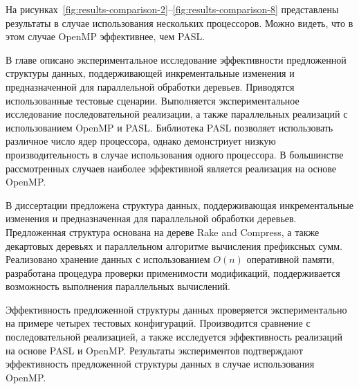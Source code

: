 \documentclass[specification,annotation]{itmo-student-thesis}
\begin{document}
На рисунках~\ref{fig:results-comparison-2}--\ref{fig:results-comparison-8} представлены результаты 
в случае использования нескольких процессоров. Можно видеть, что в этом случае OpenMP эффективнее, чем PASL.


\chapterconclusion

В главе описано экспериментальное исследование эффективности предложенной структуры данных, поддерживающей инкрементальные изменения и предназначенной для параллельной обработки деревьев. 
Приводятся использованные тестовые сценарии. Выполняется экспериментальное исследование последовательной реализации, а также параллельных реализаций с использованием OpenMP и PASL. Библиотека PASL позволяет использовать различное число ядер процессора, однако демонстриует низкую производительность в случае использования одного процессора. В большинстве рассмотренных случаев наиболее эффективной является реализация на основе OpenMP. 


\startconclusionpage

В диссертации предложена структура данных, поддерживающая инкрементальные изменения и предназначенная для параллельной обработки деревьев. Предложенная структура основана на дереве Rake and Compress, а также декартовых деревьях и параллельном алгоритме вычисления префиксных сумм. Реализовано хранение данных с использованием $O(n)$ оперативной памяти, разработана процедура проверки применимости модификаций, поддерживается возможность выполнения параллельных вычислений. 

Эффективность предложенной структуры данных проверяется экспериментально на примере четырех тестовых конфигураций. Производится сравнение с последовательной реализацией, а также исследуется эффективность реализаций на основе PASL и OpenMP. Результаты экспериментов подтверждают эффективность предложенной структуры данных в случае использования OpenMP. 

\printmainbibliography
\end{document}

